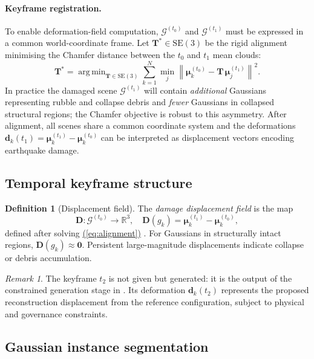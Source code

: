 \documentclass[11pt,a4paper]{article}
\renewcommand{\eqref}[1]{%
    \hyperref[#1]{\textcolor{eqred}{(\ref*{#1})}}%
}
\theoremstyle{plain}
\theoremstyle{definition}
\newtheorem{definition}[theorem]{Definition}
\theoremstyle{remark}
\newtheorem{remark}[theorem]{Remark}
\newcommand{\norm}[1]{\left\lVert #1 \right\rVert}
\DeclareMathOperator*{\argmin}{arg\,min}
\newcommand{\SE}{\mathrm{SE}}
\newcommand{\GS}{\mathcal{G}}
\begin{document}
\paragraph{Keyframe registration.}
To enable deformation-field computation, $\GS^{(t_0)}$ and $\GS^{(t_1)}$
must be expressed in a common world-coordinate frame. Let
$\mathbf{T}^* \in \SE(3)$ be the rigid alignment minimising the
Chamfer distance between the $t_0$ and $t_1$ mean clouds:
\begin{equation}
  \mathbf{T}^* = \argmin_{\mathbf{T} \in \SE(3)}
  \sum_{k=1}^{N}
  \min_{j} \norm{{\boldsymbol\mu}_k^{(t_0)}
  - \mathbf{T}\,{\boldsymbol\mu}_j^{(t_1)}}^2.
  \label{eq:alignment}
\end{equation}
In practice the damaged scene $\GS^{(t_1)}$ will contain
\emph{additional} Gaussians representing rubble and collapse debris and
\emph{fewer} Gaussians in collapsed structural regions; the Chamfer
objective is robust to this asymmetry. After alignment, all scenes
share a common coordinate system and the deformations
$\mathbf{d}_k(t_1) = {\boldsymbol\mu}_k^{(t_1)} - {\boldsymbol\mu}_k^{(t_0)}$
can be interpreted as displacement vectors encoding earthquake damage.

\subsection{Temporal keyframe structure}
\label{sec:layer1_keyframes}

\begin{definition}[Displacement field]
The \emph{damage displacement field} is the map
\[
  \mathbf{D} : \GS^{(t_0)} \to \mathbb{R}^3,
  \quad
  \mathbf{D}(g_k) = {\boldsymbol\mu}_k^{(t_1)} - {\boldsymbol\mu}_k^{(t_0)},
\]
defined after solving \eqref{eq:alignment}. For Gaussians in structurally
intact regions, $\mathbf{D}(g_k) \approx \mathbf{0}$. Persistent
large-magnitude displacements indicate collapse or debris accumulation.
\end{definition}

\begin{remark}
The keyframe $t_2$ is not given but generated: it is the output of the
constrained generation stage in . Its deformation
$\mathbf{d}_k(t_2)$ represents the proposed reconstruction displacement
from the reference configuration, subject to physical and governance
constraints.
\end{remark}

\subsection{Gaussian instance segmentation}
\label{sec:layer1_seg}
\end{document}
